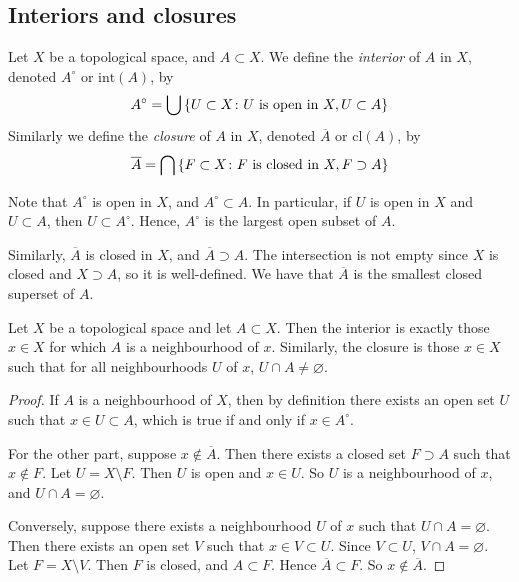 \subsection{Interiors and closures}
\begin{definition}
	Let \( X \) be a topological space, and \( A \subset X \).
	We define the \textit{interior} of \( A \) in \( X \), denoted \( A^\circ \) or \( \mathrm{int}(A) \), by
	\[ A^\circ = \bigcup \qty{ U \subset X \colon U \text{ is open in } X, U \subset A } \]
	Similarly we define the \textit{closure} of \( A \) in \( X \), denoted \( \overline A \) or \( \mathrm{cl}(A) \), by
	\[ \overline A = \bigcap \qty{ F \subset X \colon F \text{ is closed in } X, F \supset A } \]
\end{definition}
\begin{remark}
	Note that \( A^\circ \) is open in \( X \), and \( A^\circ \subset A \).
	In particular, if \( U \) is open in \( X \) and \( U \subset A \), then \( U \subset A^\circ \).
	Hence, \( A^\circ \) is the largest open subset of \( A \).

	Similarly, \( \overline A \) is closed in \( X \), and \( \overline A \supset A \).
	The intersection is not empty since \( X \) is closed and \( X \supset A \), so it is well-defined.
	We have that \( \overline A \) is the smallest closed superset of \( A \).
\end{remark}
\begin{proposition}
	Let \( X \) be a topological space and let \( A \subset X \).
	Then the interior is exactly those \( x \in X \) for which \( A \) is a neighbourhood of \( x \).
	Similarly, the closure is those \( x \in X \) such that for all neighbourhoods \( U \) of \( x \), \( U \cap A \neq \varnothing \).
\end{proposition}
\begin{proof}
	If \( A \) is a neighbourhood of \( X \), then by definition there exists an open set \( U \) such that \( x \in U \subset A \), which is true if and only if \( x \in A^\circ \).

	For the other part, suppose \( x \not\in \overline A \).
	Then there exists a closed set \( F \supset A \) such that \( x \not\in F \).
	Let \( U = X \setminus F \).
	Then \( U \) is open and \( x \in U \).
	So \( U \) is a neighbourhood of \( x \), and \( U \cap A = \varnothing \).

	Conversely, suppose there exists a neighbourhood \( U \) of \( x \) such that \( U \cap A = \varnothing \).
	Then there exists an open set \( V \) such that \( x \in V \subset U \).
	Since \( V \subset U \), \( V \cap A = \varnothing \).
	Let \( F = X \setminus V \).
	Then \( F \) is closed, and \( A \subset F \).
	Hence \( \overline A \subset F \).
	So \( x \not\in \overline A \).
\end{proof}

